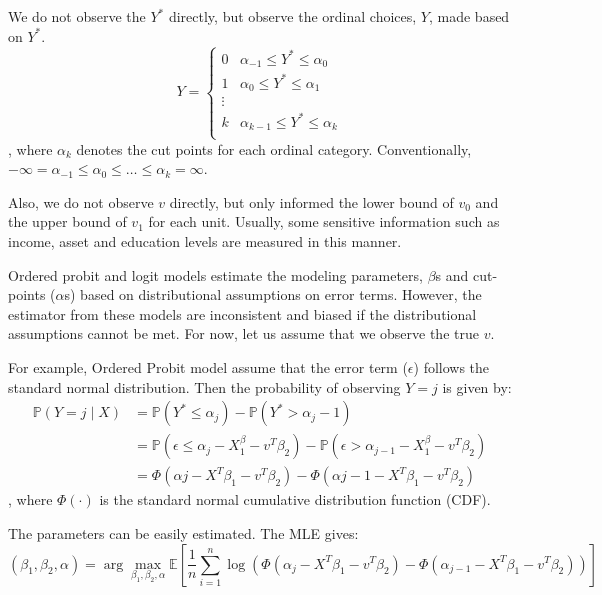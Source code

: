 \documentclass{article}
\begin{document}
We do not observe the $Y^{\ast}$ directly, but observe the ordinal choices, $Y$, made based on $Y^{\ast}$. 
$$
    Y = \begin{cases}
        0 & \alpha_{-1} \le Y^{\ast} \le \alpha_{0} \\
        1 & \alpha_{0} \le Y^{\ast} \le \alpha_{1} \\
        \vdots &  \\
        k & \alpha_{k-1} \le Y^{\ast} \le \alpha_{k} \\
    \end{cases}
$$ 
, where $\alpha_{k}$ denotes the cut points for each ordinal category. Conventionally, $-\infty = \alpha_{-1} \le \alpha_{0} \le \ldots \le \alpha_{k} = \infty$. 

Also, we do not observe $v$ directly, but only informed the lower bound of $v_{0}$ and the upper bound of $v_{1}$ for each unit. Usually, some sensitive information such as income, asset and education levels are measured in this manner. 

Ordered probit and logit models estimate the modeling parameters, $\beta$s and cut-points ($\alpha$s) based on distributional assumptions on error terms. However, the estimator from these models are inconsistent and biased if the distributional assumptions cannot be met. For now, let us assume that we observe the true $v$.

For example, Ordered Probit model assume that the error term ($\epsilon$) follows the standard normal distribution. Then the probability of observing $Y = j$ is given by:
$$
\begin{aligned}
    \mathbb{P}\left(Y = j \mid X\right) &= \mathbb{P}\left(Y^\ast \le \alpha_j\right) - \mathbb{P}\left(Y^\ast > \alpha_j-1\right) \\
    &=\mathbb{P}\left(\epsilon \le \alpha_j - X^\beta_{1} - v^T \beta_{2}\right) - \mathbb{P}\left(\epsilon > \alpha_{j-1} - X^\beta_{1} - v^T \beta_{2}\right)\\
    &= \Phi(\alpha{j} - X^{T}\beta_{1} - v^{T} \beta_{2}) - \Phi(\alpha{j-1} - X^{T}\beta_{1} - v^{T} \beta_{2})
\end{aligned}
$$
, where $\Phi(\cdot)$ is the standard normal cumulative distribution function (CDF). 

The parameters can be easily estimated. The MLE gives:
$$
    (\beta_{1}, \beta_{2}, \alpha) = \arg\max_{\beta_{1}, \beta_{2}, \alpha} \mathbb{E}\left[\frac{1}{n} \sum_{i=1}^{n} \log \left( \Phi(\alpha_{j} - X^{T}\beta_{1} - v^{T}\beta_{2}) - \Phi(\alpha_{j-1} - X^{T}\beta_{1} - v^{T}\beta_{2}) \right) \right]
$$ 
\end{document}
